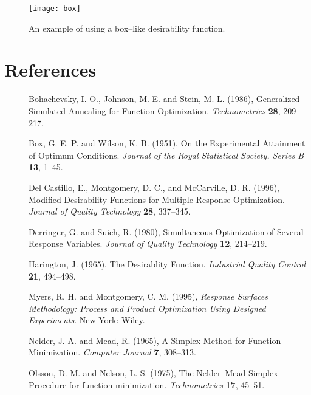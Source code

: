\documentclass[12pt]{article}
\begin{document}
\begin{figure}[ht]
   \begin{center}	
      \texttt{[image: box]}  
      \caption{An example of using a box--like desirability function.}
      \label{f:box}   
\end{center}	
\end{figure}


\clearpage
\section{References}

\begin{description}

\item [] Bohachevsky, I. O., Johnson, M. E. and Stein, M. L. (1986), Generalized Simulated Annealing for Function Optimization. {\em Technometrics} {\bf 28}, 209--217.

\item [] Box, G. E. P. and Wilson, K. B. (1951), On the Experimental Attainment of Optimum Conditions.
{\em Journal of the Royal Statistical Society, Series B} {\bf 13}, 1--45.

\item [] Del Castillo, E., Montgomery, D. C., and McCarville, D. R. (1996),
Modified Desirability Functions for Multiple Response Optimization.
{\em Journal of Quality Technology} {\bf 28}, 337--345.

\item [] Derringer, G. and Suich, R. (1980),
Simultaneous Optimization of Several Response Variables.
{\em Journal of Quality Technology} {\bf 12}, 214--219.
\item [] Harington, J. (1965), The Desirablity Function. {\em Industrial Quality Control} {\bf 21}, 494--498.

\item [] Myers, R. H. and Montgomery, C. M. (1995), 
{\em Response Surfaces Methodology: Process and Product Optimization 
Using Designed Experiments}. New York: Wiley.

\item [] Nelder, J. A. and Mead, R. (1965), A Simplex Method for Function Minimization. {\em Computer Journal}
{\bf 7}, 308--313.

\item [] Olsson, D. M. and Nelson, L. S. (1975), The Nelder--Mead Simplex Procedure for function minimization.
{\em Technometrics} {\bf 17}, 45--51.

\end{description}
\end{document}
